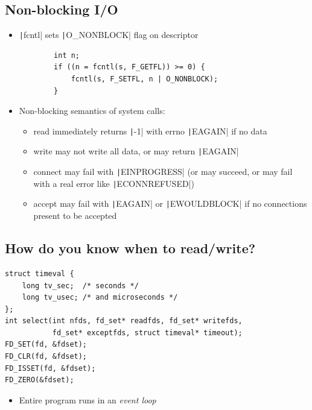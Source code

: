 {\subsection{Non-blocking I/O}
\begin{itemize}[nosep]
    \item \texttt|fcntl| sets \texttt|O_NONBLOCK| flag on descriptor
          \begin{verbatim}
        int n;
        if ((n = fcntl(s, F_GETFL)) >= 0) {
            fcntl(s, F_SETFL, n | O_NONBLOCK);
        }
    \end{verbatim}
    \item Non-blocking semantics of system calls:
          \begin{itemize}[nosep]
              \item read immediately returns \texttt|-1| with errno \texttt|EAGAIN| if no data
              \item write may not write all data, or may return \texttt|EAGAIN|
              \item connect may fail with \texttt|EINPROGRESS| (or may succeed, or may fail with a real error like \texttt|ECONNREFUSED|)
              \item accept may fail with \texttt|EAGAIN| or \texttt|EWOULDBLOCK| if no connections present to be accepted
          \end{itemize}
\end{itemize}
\subsection{How do you know when to read/write?}
\begin{verbatim}
struct timeval {
    long tv_sec;  /* seconds */
    long tv_usec; /* and microseconds */
};
int select(int nfds, fd_set* readfds, fd_set* writefds,
           fd_set* exceptfds, struct timeval* timeout);
FD_SET(fd, &fdset);
FD_CLR(fd, &fdset);
FD_ISSET(fd, &fdset);
FD_ZERO(&fdset);
\end{verbatim}
\begin{itemize}[nosep]\item Entire program runs in an \emph{event loop}\end{itemize}
}
